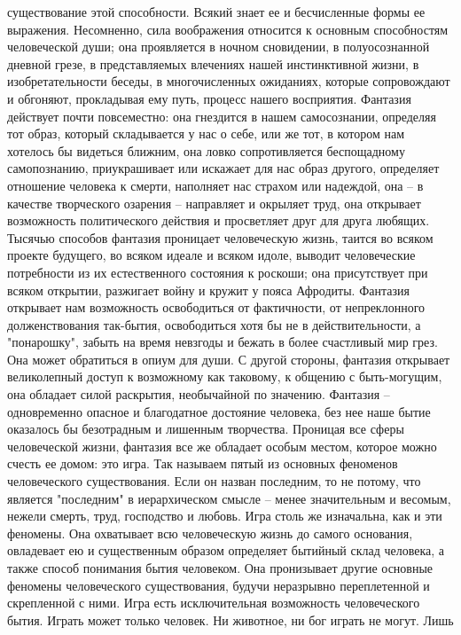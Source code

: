 \documentclass[12pt]{article}
\begin{document}
существование этой способности. Всякий знает ее и бесчисленные формы ее выражения. Несомненно, сила
воображения относится к основным способностям человеческой души; она проявляется в ночном сновидении, в
полуосознанной дневной грезе, в представляемых влечениях нашей инстинктивной жизни, в изобретательности
беседы, в многочисленных ожиданиях, которые сопровождают и обгоняют, прокладывая ему путь, процесс
нашего восприятия. Фантазия действует почти повсеместно: она гнездится в нашем самосознании, определяя
тот образ, который складывается у нас о себе, или же тот, в котором нам хотелось бы видеться ближним, она
ловко  сопротивляется  беспощадному  самопознанию,  приукрашивает  или  искажает  для  нас  образ  другого,
определяет отношение человека к смерти, наполняет нас страхом или надеждой, она -- в качестве творческого
озарения -- направляет и окрыляет труд, она открывает возможность политического действия и просветляет
друг  для  друга  любящих.  Тысячью  способов  фантазия  проницает  человеческую  жизнь,  таится  во  всяком
проекте будущего, во всяком идеале и всяком идоле, выводит человеческие потребности из их естественного
состояния к роскоши; она присутствует при всяком открытии, разжигает войну и кружит у пояса Афродиты.
Фантазия открывает нам возможность освободиться от фактичности, от непреклонного долженствования так-бытия, освободиться хотя бы не в действительности, а "понарошку", забыть на время невзгоды и бежать в более
счастливый  мир  грез.  Она  может  обратиться  в  опиум  для  души.  С  другой  стороны,  фантазия  открывает
великолепный доступ к возможному как таковому, к общению с быть-могущим, она обладает силой раскрытия,
необычайной по значению. Фантазия -- одновременно опасное и благодатное достояние человека, без нее наше
бытие оказалось бы безотрадным и лишенным творчества. Проницая все сферы человеческой жизни, фантазия
все же обладает особым местом, которое можно счесть ее домом: это игра.
Так называем пятый из основных феноменов человеческого существования. Если он назван последним, то не
потому, что является "последним" в иерархическом смысле -- менее значительным и весомым, нежели смерть,
труд, господство и любовь. Игра столь же изначальна, как и эти феномены. Она охватывает всю человеческую
жизнь до самого основания, овладевает ею и существенным образом определяет бытийный склад человека, а
также  способ  понимания  бытия  человеком.  Она  пронизывает  другие  основные  феномены  человеческого
существования,  будучи  неразрывно  переплетенной  и  скрепленной  с  ними.  Игра  есть  исключительная
возможность человеческого бытия. Играть может только человек. Ни животное, ни бог играть не могут. Лишь
\end{document}
